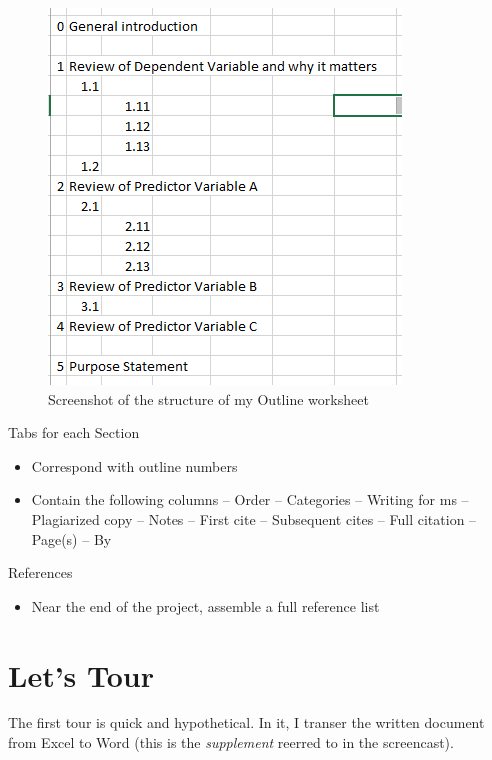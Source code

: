 \documentclass[
  english,
]{book}
\providecommand{\tightlist}{%
  \setlength{\itemsep}{0pt}\setlength{\parskip}{0pt}}
\begin{document}
\begin{figure}
\centering
\includegraphics{images/Excel/Outline.png}
\caption{Screenshot of the structure of my Outline worksheet}
\end{figure}

Tabs for each Section

\begin{itemize}
\tightlist
\item
  Correspond with outline numbers
\item
  Contain the following columns
  -- Order
  -- Categories
  -- Writing for ms
  -- Plagiarized copy
  -- Notes
  -- First cite
  -- Subsequent cites
  -- Full citation
  -- Page(s)
  -- By
\end{itemize}

References

\begin{itemize}
\tightlist
\item
  Near the end of the project, assemble a full reference list
\end{itemize}

\hypertarget{lets-tour}{%
\section{Let's Tour}\label{lets-tour}}

The first tour is quick and hypothetical. In it, I transer the written document from Excel to Word (this is the \emph{supplement} reerred to in the screencast).
\end{document}
